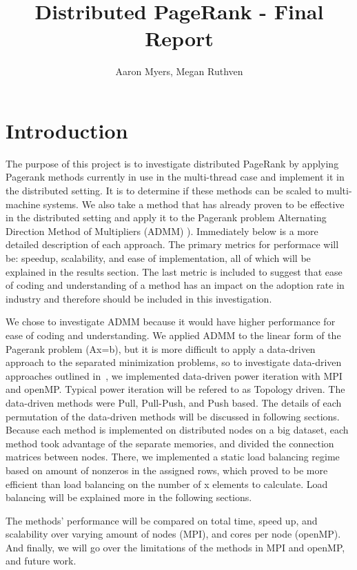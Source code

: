 \documentclass[letterpaper,12pt,onecolumn]{article}
\title{Distributed PageRank - Final Report}
\author{Aaron Myers, Megan Ruthven}
\begin{document}
\maketitle
\tableofcontents
\pagebreak
\section{Introduction}
The purpose of this project is to investigate distributed PageRank by applying Pagerank methods currently in use in the multi-thread case and implement it in the distributed setting. It is to determine if these methods can be scaled to multi-machine systems. We also take a method that has already proven to be effective in the distributed setting and apply it to the Pagerank problem Alternating Direction Method of Multipliers (ADMM) \cite{ADMM}). Immediately below is a more detailed description of each approach. The primary metrics for performace will be: speedup, scalability, and ease of implementation, all of which will be explained in the results section. The last metric is included to suggest that ease of coding and understanding of a method has an impact on the adoption rate in industry and therefore should be included in this investigation.

We chose to investigate ADMM \cite{ADMM} because it would have higher performance for ease of coding and understanding. We applied ADMM to the linear form of the Pagerank problem (Ax=b), but it is more difficult to apply a data-driven approach to the separated minimization problems, so to investigate data-driven approaches outlined in~\cite{Joyce}, we implemented data-driven power iteration with MPI and openMP. Typical power iteration will be refered to as Topology driven. The data-driven methods were Pull, Pull-Push, and Push based. The details of each permutation of the data-driven methods will be discussed in following sections. Because each method is implemented on distributed nodes on a big dataset, each method took advantage of the separate memories, and divided the connection matrices between nodes. There, we implemented a static load balancing regime based on amount of nonzeros in the assigned rows, which proved to be more efficient than load balancing on the number of x elements to calculate. Load balancing will be explained more in the following sections. 

The methods' performance will be compared on total time, speed up, and scalability over varying amount of nodes (MPI), and cores per node (openMP). And finally, we will go over the limitations of the methods in MPI and openMP, and future work. 
\end{document}
